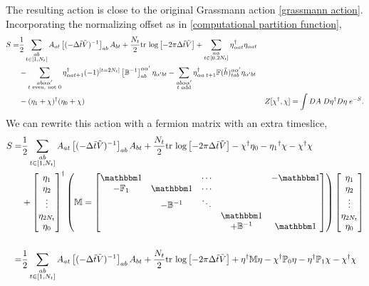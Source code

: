 The resulting action is close to the original Grassmann action \eqref{grassmann action}.
Incorporating the normalizing offset as in \eqref{computational partition function},
\begin{align}
	S =&
	\frac{1}{2} \sum_{\substack{ab \\ t \in [1,N_t]}} A_{at} \left[(-\Delta\tilde{t} \tilde{V})^{-1}\right]_{ab} A_{bt} + \frac{N_t}{2} \text{tr log}\left[ -2\pi \Delta\tilde{t}\tilde{V} \right]
+	\sum_{\substack{a \alpha \\ t \in [0, 2N_t]}} \eta{}^{\dagger}_{\alpha a t} \eta_{\alpha a t}
\nonumber\\
	&
-	\sum_{\substack{ab \alpha\alpha' \\ t\text{ even, not 0}}} \eta{}^{\dagger}_{\alpha a t+1} (-1)^{[t=2N_t]}\left[\mathbb{B}^{-1}\right]^{\alpha\alpha'}_{ab} \eta_{\alpha' b t}
-	\sum_{\substack{ab \alpha\alpha' \\ t\text{ odd}}}\eta{}^{\dagger}_{\alpha a\; t+1} \mathbb{F}(\tilde{h})^{\alpha\alpha'}_{tab} \eta_{\alpha' b t}
\nonumber\\
	&
-	(\eta_1+\chi){}^{\dagger} (\eta_0+\chi)
	&
	Z[\chi{}^{\dagger}, \chi] = \int DA\; D\eta{}^{\dagger} D\eta\; e^{-S}.
\end{align}
We can rewrite this action with a fermion matrix with an extra timeslice,
\begin{align}
	S =&
	\frac{1}{2} \sum_{\substack{ab \\ t \in [1,N_t]}} A_{at} \left[(-\Delta\tilde{t} \tilde{V})\inverse\right]_{ab} A_{bt} + \frac{N_t}{2} \trlog{ -2\pi \Delta\tilde{t}\tilde{V} }
	- \chi\adjoint \eta_0 - \eta_1\adjoint \chi - \chi\adjoint\chi
\nonumber\\
	&
	+ \begin{bmatrix} \eta_1 \\ \eta_2 \\ \vdots \\ \eta_{2N_t} \\ \eta_0 \end{bmatrix}^\dagger
	\left(
	\MM =
	\begin{bmatrix}
		\one	&	&	\cdots	&		&	-\one	\\
		-\FF_1	&	\one	&	\cdots	&	&	\\
				&	-\BB\inverse	&	\ddots	&	&	\\
				&		&	&	\one	&	\\
				&		&	&	+\BB\inverse	&	\one
	\end{bmatrix}
	\right)
	\begin{bmatrix} \eta_1 \\ \eta_2 \\ \vdots \\ \eta_{2N_t} \\ \eta_0 \end{bmatrix}
	\nonumber\\
	&
\nonumber\\
	=&
	\frac{1}{2} \sum_{\substack{ab \\ t \in [1,N_t]}} A_{at} \left[(-\Delta\tilde{t} \tilde{V})\inverse\right]_{ab} A_{bt} + \frac{N_t}{2} \trlog{ -2\pi \Delta\tilde{t}\tilde{V} }
	+ \eta\adjoint \MM \eta
	- \chi\adjoint \PP_0 \eta - \eta\adjoint \PP_1 \chi - \chi\adjoint\chi
\end{align}
